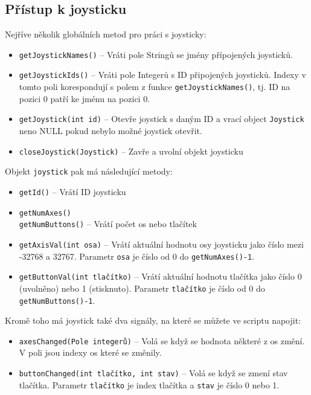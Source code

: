\documentclass[12pt, a4paper, oneside]{article}
\begin{document}
\newpage
\subsection*{Přístup k joysticku}
Nejříve několik globálních metod pro práci s joysticky:
\begin{itemize}
    \item {\color{blue}\verb/getJoystickNames()/} -- Vráti pole Stringů se jmény přípojených joysticků.
    \item {\color{blue}\verb/getJoystickIds()/} -- Vráti pole Integerů s ID připojených joysticků. Indexy v tomto poli korespondují s polem z funkce \verb|getJoystickNames()|, tj. ID na pozici 0 patří ke jménu na pozici 0.
    \item {\color{blue}\verb/getJoystick(int id)/} -- Otevře joystick s daným ID a vrací object \verb|Joystick| neno NULL pokud nebylo možné joystick otevřit.
    \item {\color{blue}\verb/closeJoystick(Joystick)/} -- Zavře a uvolní objekt joysticku
\end{itemize}
Objekt \verb|joystick| pak má následující metody:
\begin{itemize}
    \item {\color{blue}\verb/getId()/} -- Vrátí ID joysticku
    \item {\color{blue}\verb/getNumAxes()/} \\
          {\color{blue}\verb/getNumButtons()/} -- Vrátí počet os nebo tlačítek
    \item {\color{blue}\verb/getAxisVal(int osa)/} -- Vrátí aktuální hodnotu osy joysticku jako číslo mezi -32768 a 32767. Parametr \verb|osa| je číslo od 0 do \verb|getNumAxes()-1|.
    \item {\color{blue}\verb/getButtonVal(int tlačítko)/} -- Vrátí aktuální hodnotu tlačítka jako číslo 0 (uvolněno) nebo 1 (stisknuto). Parametr \verb|tlačítko| je číslo od 0 do \verb|getNumButtons()-1|.
\end{itemize}
Kromě toho má joystick také dva signály, na které se můžete ve scriptu napojit:
\begin{itemize}
    \item {\color{blue}\verb/axesChanged(Pole integerů)/} -- Volá se když se hodnota některé z os změní. V poli jsou indexy os které se změnily.
    \item {\color{blue}\verb/buttonChanged(int tlačítko, int stav)/} -- Volá se když se zmení stav tlačítka. Parametr \verb|tlačítko| je index tlačítka a \verb|stav| je číslo 0 nebo 1.
\end{itemize}
\end{document}
